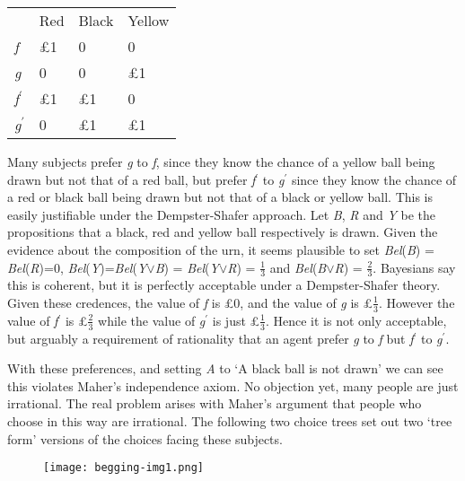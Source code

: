 \begin{center}
\tablehead{}
\begin{tabular}{l l l l}%
~ &
Red &
Black &
Yellow \\ %
\itshape f &
\pounds1 &
0 &
0\\
 \itshape g &
 0 &
 0 &
 \pounds1\\
 \textit{f}\(^\prime\) &
 \pounds1 &
 \pounds1 &
 0\\
 \textit{g}\(^\prime\) &
 0 &
 \pounds1 &
 \pounds1\\
\end{tabular}
\end{center}

Many subjects prefer \textit{g} to \textit{f}, since they know the chance of a yellow ball being drawn but not that of a red ball, but prefer \textit{f}\(^\prime\) to \textit{g}\(^\prime\) since they know the chance of a red or black ball being drawn but not that of a black or yellow ball. This is easily justifiable under the Dempster-Shafer approach. Let \textit{B}, \textit{R} and \textit{Y} be the propositions that a black, red and yellow ball respectively is drawn. Given the evidence about the composition of the urn, it seems plausible to set \textit{Bel}(\textit{B}) = \textit{Bel}(\textit{R})=0, \textit{Bel}(\textit{Y})=\textit{Bel}(\textit{Y}${\vee}$\textit{B}) = \textit{Bel}(\textit{Y}${\vee}$\textit{R}) = \(\frac{1}{3}\) and \textit{Bel}(\textit{B}${\vee}$\textit{R}) = \(\frac{2}{3}\). Bayesians say this is coherent, but it is perfectly acceptable under a Dempster-Shafer theory. Given these credences, the value of \textit{f} is \pounds0, and the value of \textit{g} is \pounds\(\frac{1}{3}\). However the value of \textit{f}\(^\prime\) is \pounds\(\frac{2}{3}\) while the value of \textit{g}\(^\prime\) is just \pounds\(\frac{1}{3}\). Hence it is not only acceptable, but arguably a requirement of rationality that an agent prefer \textit{g} to \textit{f} but \textit{f}\(^\prime\) to \textit{g}\(^\prime\).

With these preferences, and setting \textit{A} to `A black ball is not drawn' we can see this violates Maher's independence axiom. No objection yet, many people are just irrational. The real problem arises with Maher's argument that people who choose in this way are irrational. The following two choice trees set out two `tree form' versions of the choices facing these subjects.

\begin{figure}
\texttt{[image: begging-img1.png]}
\end{figure}

